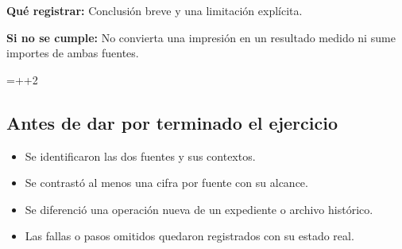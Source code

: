 \begin{enumerate}
{\textbf{Qué registrar:} Conclusión breve y una limitación explícita.

\textbf{Si no se cumple:} No convierta una impresión en un resultado medido ni sume importes de ambas fuentes.

\par
}
=\dimexpr{}++2\baselineskip\relax
\ifdim\dimen0<\textheight
\Needspace{\dimen0}
\endgroup
\item \begin{samepage}
\textbf{Minutos 9-10.} Cierre con una conclusión comercial acotada y un límite. Explique qué tendría que pedir al analista para otra pregunta.

{\small\textbf{Tiempo máximo previsto de este bloque:} 1 minuto.\par}
\textbf{Qué debe observar:} Se interpreta el dato observado sin afirmar aumento de ventas, moneda común o compatibilidad universal.

\textbf{Qué registrar:} Conclusión breve y una limitación explícita.

\textbf{Si no se cumple:} No convierta una impresión en un resultado medido ni sume importes de ambas fuentes.

\end{samepage}
\else
\endgroup
\item \textbf{Minutos 9-10.} Cierre con una conclusión comercial acotada y un límite. Explique qué tendría que pedir al analista para otra pregunta.

{\small\textbf{Tiempo máximo previsto de este bloque:} 1 minuto.\par}
\textbf{Qué debe observar:} Se interpreta el dato observado sin afirmar aumento de ventas, moneda común o compatibilidad universal.

\textbf{Qué registrar:} Conclusión breve y una limitación explícita.

\textbf{Si no se cumple:} No convierta una impresión en un resultado medido ni sume importes de ambas fuentes.

\fi
\end{enumerate}
\subsection{Antes de dar por terminado el ejercicio}
\begin{itemize}
\item Se identificaron las dos fuentes y sus contextos.
\item Se contrastó al menos una cifra por fuente con su alcance.
\item Se diferenció una operación nueva de un expediente o archivo histórico.
\item Las fallas o pasos omitidos quedaron registrados con su estado real.
\end{itemize}

